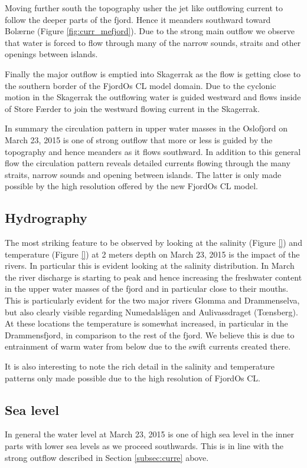 Moving further south the topography usher the jet like outflowing current to follow the deeper parts of the fjord. Hence it meanders southward toward Bol{\ae}rne (Figure \ref{fig:curr_mefjord}). Due to the strong main outflow we observe that water is forced to flow through many of the narrow sounds, straits and other openings between islands.    
 

Finally the major outflow is emptied into Skagerrak as the flow is getting close to the southern border of the FjordOs CL model domain. Due to the cyclonic motion in the Skagerrak the outflowing water is guided westward and flows inside of Store F{\ae}rder to join the westward flowing current in the Skagerrak.    
  

In summary the circulation pattern in upper water masses in the Oslofjord on March 23, 2015 is one of strong outflow that more or less is guided by the topography and hence meanders as it flows southward. In addition to this general flow the circulation pattern reveals detailed currents flowing through the many straits, narrow sounds and opening between islands. The latter is only made possible by the high resolution offered by the new FjordOs CL model.

\subsection{Hydrography}
\label{subsec:hydro}
The most striking feature to be observed by looking at the salinity (Figure \ref{}) and temperature (Figure \ref{}) at 2 meters depth on March 23, 2015 is the impact of the rivers. In particular this is evident looking at the salinity distribution. In March the river discharge is starting to peak and hence increasing the freshwater content in the upper water masses of the fjord and in particular close to their mouths. This is particularly evident for the two major rivers Glomma and Drammenselva, but also clearly visible regarding Numedalsl{\aa}gen and Aulivassdraget (T{\oe}nsberg). At these locations the temperature is somewhat increased, in particular in the Drammensfjord, in comparison to the rest of the fjord. We believe this is due to entrainment of warm water from below due to the swift currents created there.    
   
  

It is also interesting to note the rich detail in the salinity and temperature patterns only made possible due to the high resolution of FjordOs CL. 

\subsection{Sea level}
\label{subsec:seale}
In general the water level at March 23, 2015 is one of high sea level in the inner parts with lower sea levels as we proceed southwards. This is in line with the strong outflow described in Section \ref{subsec:curre} above.
   
